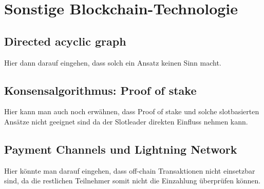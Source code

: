 \chapter{Sonstige Blockchain-Technologie} %
\section{Directed acyclic graph}
Hier dann darauf eingehen, dass solch ein Ansatz keinen Sinn macht.
\section{Konsensalgorithmus: Proof of stake }
Hier kann man auch noch erwähnen, dass Proof of stake und solche slotbasierten Ansätze nicht geeignet sind da der Slotleader direkten Einfluss nehmen kann.
\section{Payment Channels und Lightning Network}
Hier könnte man darauf eingehen, dass off-chain Transaktionen nicht einsetzbar sind, da die restlichen Teilnehmer somit nicht die Einzahlung überprüfen können.